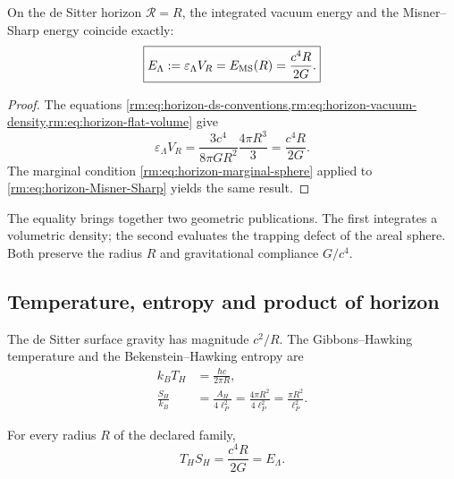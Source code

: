 \begin{theorem}
\label{rm:thm:horizon-vacuum-MS}
On the de Sitter horizon \(\mathcal R=R\), the integrated vacuum
energy and the Misner--Sharp energy coincide exactly:
\begin{equation}
 \boxed{
 E_\Lambda
 :=\varepsilon_\Lambda V_R
 =E_{\rm MS}(R)
 =\frac{c^4R}{2G}.}
 \label{rm:eq:horizon-E-Lambda}
\end{equation}
\end{theorem}

\begin{proof}
The equations
\cref{rm:eq:horizon-ds-conventions,rm:eq:horizon-vacuum-density,rm:eq:horizon-flat-volume}
give
\[
 \varepsilon_\Lambda V_R
 =\frac{3c^4}{8\pi GR^2}\frac{4\pi R^3}{3}
 =\frac{c^4R}{2G}.
\]
The marginal condition \cref{rm:eq:horizon-marginal-sphere} applied to
\cref{rm:eq:horizon-Misner-Sharp} yields the same result.
\end{proof}

The equality brings together two geometric publications. The first integrates a
volumetric density; the second evaluates the trapping defect of the
areal sphere. Both preserve the radius \(R\) and gravitational compliance
\(G/c^4\).

\subsection{Temperature, entropy and product of horizon}

The de Sitter surface gravity has magnitude \(c^2/R\). The Gibbons--Hawking
temperature \cite{rm:GibbonsHawking1977} and the Bekenstein--Hawking
entropy \cite{rm:Bekenstein1973,rm:Hawking1975} are
\begin{align}
 k_BT_H&=\frac{\hbar c}{2\pi R},
 \label{rm:eq:horizon-temperature}\\
 \frac{S_H}{k_B}
 &=\frac{A_H}{4\ell_P^2}
 =\frac{4\pi R^2}{4\ell_P^2}
 =\frac{\pi R^2}{\ell_P^2}.
 \label{rm:eq:horizon-entropy}
\end{align}

\begin{theorem}
\label{rm:thm:horizon-TS}
For every radius \(R\) of the declared family,
\begin{equation}
 \boxed{
 T_HS_H=\frac{c^4R}{2G}=E_\Lambda.}
 \label{rm:eq:horizon-TS-E}
\end{equation}
\end{theorem}

